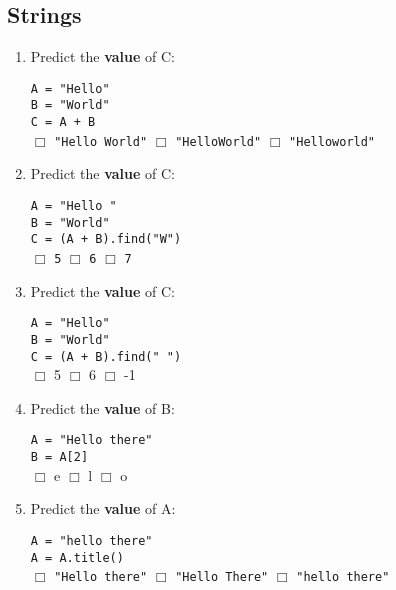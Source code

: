 \documentclass[11pt]{report}
\begin{document}
\subsection*{Strings}
\begin{enumerate}

    \item Predict the \textbf{value} of C:

    {\tt A = "Hello"}\\
    {\tt B = "World"}\\
    {\tt C = A + B}\\
    $\Box$ {\tt "Hello World"} \hspace{3em} $\Box$ {\tt "HelloWorld"} \hspace{3em} $\Box$ {\tt "Helloworld"}

    \item Predict the \textbf{value} of C:

    {\tt A = "Hello "}\\
    {\tt B = "World"}\\
    {\tt C = (A + B).find("W")}\\
    $\Box$ {\tt 5} \hspace{3em} $\Box$ {\tt 6} \hspace{3em} $\Box$ {\tt 7}

    \item Predict the \textbf{value} of C:

    {\tt A = "Hello"}\\
    {\tt B = "World"}\\
    {\tt C = (A + B).find(" ")}\\
    $\Box$ 5 \hspace{3em} $\Box$ 6 \hspace{3em} $\Box$ -1

    \item Predict the \textbf{value} of B:

    {\tt A = "Hello there"}\\
    {\tt B = A[2]}\\
    $\Box$ e \hspace{3em} $\Box$ l \hspace{3em} $\Box$ o

    \item Predict the \textbf{value} of A:

    {\tt A = "hello there"}\\
    {\tt A = A.title()}\\
    $\Box$ {\tt "Hello there"} \hspace{3em} $\Box$ {\tt "Hello There"} \hspace{3em} $\Box$ {\tt "hello there"}


\end{enumerate}
\end{document}
